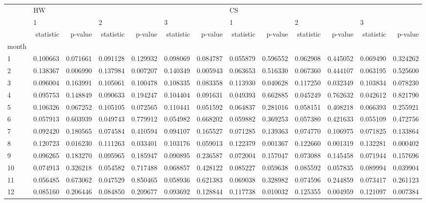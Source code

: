 \begin{tabular}{lrrrrrrrrrrrr}
\toprule
{} & \multicolumn{6}{l}{HW} & \multicolumn{6}{l}{CS} \\
{} & \multicolumn{2}{l}{1} & \multicolumn{2}{l}{2} & \multicolumn{2}{l}{3} & \multicolumn{2}{l}{1} & \multicolumn{2}{l}{2} & \multicolumn{2}{l}{3} \\
{} & statistic &   p-value & statistic &   p-value & statistic &   p-value & statistic &   p-value & statistic &   p-value & statistic &   p-value \\
month &           &           &           &           &           &           &           &           &           &           &           &           \\
\midrule
1     &  0.100663 &  0.071661 &  0.091128 &  0.129932 &  0.098069 &  0.084787 &  0.055879 &  0.596552 &  0.062908 &  0.445052 &  0.069490 &  0.324262 \\
2     &  0.138367 &  0.006990 &  0.137984 &  0.007207 &  0.140349 &  0.005943 &  0.063653 &  0.516330 &  0.067360 &  0.444107 &  0.063195 &  0.525600 \\
3     &  0.096004 &  0.163991 &  0.105061 &  0.100478 &  0.108335 &  0.083358 &  0.113930 &  0.040628 &  0.117250 &  0.032349 &  0.103834 &  0.078230 \\
4     &  0.095753 &  0.148849 &  0.090633 &  0.194247 &  0.104404 &  0.091631 &  0.049393 &  0.662885 &  0.045249 &  0.762632 &  0.042612 &  0.821790 \\
5     &  0.106326 &  0.067252 &  0.105105 &  0.072565 &  0.110441 &  0.051592 &  0.064837 &  0.281016 &  0.058151 &  0.408218 &  0.066393 &  0.255921 \\
6     &  0.057913 &  0.603939 &  0.049743 &  0.779912 &  0.054982 &  0.668202 &  0.059882 &  0.369253 &  0.057380 &  0.421633 &  0.055109 &  0.472756 \\
7     &  0.092420 &  0.180565 &  0.074584 &  0.410594 &  0.094107 &  0.165527 &  0.071285 &  0.139363 &  0.074770 &  0.106975 &  0.071825 &  0.133864 \\
8     &  0.120723 &  0.016230 &  0.111263 &  0.033401 &  0.103176 &  0.059013 &  0.122379 &  0.001367 &  0.122660 &  0.001319 &  0.132281 &  0.000402 \\
9     &  0.096265 &  0.183270 &  0.095965 &  0.185947 &  0.090895 &  0.236587 &  0.072004 &  0.157047 &  0.073088 &  0.145458 &  0.071944 &  0.157696 \\
10    &  0.074913 &  0.326218 &  0.054582 &  0.717488 &  0.068857 &  0.428122 &  0.085227 &  0.059638 &  0.085592 &  0.057835 &  0.089994 &  0.039904 \\
11    &  0.056485 &  0.673062 &  0.047529 &  0.850465 &  0.058936 &  0.621383 &  0.069038 &  0.328982 &  0.074596 &  0.244859 &  0.073417 &  0.261123 \\
12    &  0.085160 &  0.206446 &  0.084850 &  0.209677 &  0.093692 &  0.128844 &  0.117738 &  0.010032 &  0.125355 &  0.004959 &  0.121097 &  0.007384 \\
\bottomrule
\end{tabular}
